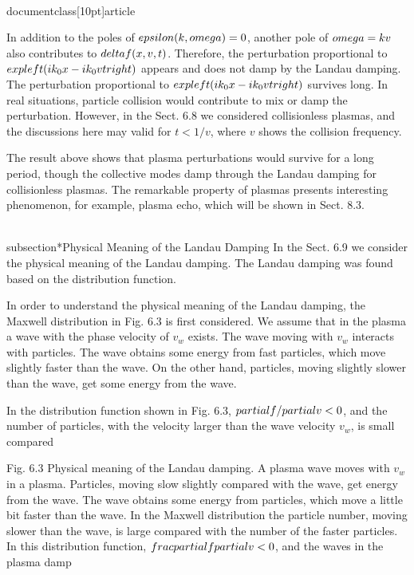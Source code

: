 \\documentclass[10pt]{article}
\begin{document}
{{{{In addition to the poles of $\\epsilon(k, \\omega)=0$, another pole of $\\omega=k v$ also contributes to $\\delta f(x, v, t)$. Therefore, the perturbation proportional to $\\exp \\left(i k_{0} x-i k_{0} v t\\right)$ appears and does not damp by the Landau damping. The perturbation proportional to
$\\exp \\left(i k_{0} x-i k_{0} v t\\right)$ survives long. In real situations, particle collision would contribute to mix or damp the perturbation. However, in the Sect. 6.8 we considered collisionless plasmas, and the discussions here may valid for $t<1 / v$, where $v$ shows the collision frequency.

The result above shows that plasma perturbations would survive for a long period, though the collective modes damp through the Landau damping for collisionless plasmas. The remarkable property of plasmas presents interesting phenomenon, for example, plasma echo, which will be shown in Sect. 8.3.

\\subsection*{Physical Meaning of the Landau Damping}
In the Sect. 6.9 we consider the physical meaning of the Landau damping. The Landau damping was found based on the distribution function.

In order to understand the physical meaning of the Landau damping, the Maxwell distribution in Fig. 6.3 is first considered. We assume that in the plasma a wave with the phase velocity of $v_{w}$ exists. The wave moving with $v_{w}$ interacts with particles. The wave obtains some energy from fast particles, which move slightly faster than the wave. On the other hand, particles, moving slightly slower than the wave, get some energy from the wave.

In the distribution function shown in Fig. 6.3, $\\partial f / \\partial v<0$, and the number of particles, with the velocity larger than the wave velocity $v_{w}$, is small compared

Fig. 6.3 Physical meaning of the Landau damping. A plasma wave moves with $v_{w}$ in a plasma. Particles, moving slow slightly compared with the wave, get energy from the wave. The wave obtains some energy from particles, which move a little bit faster than the wave. In the Maxwell distribution the particle number, moving slower than the wave, is large compared with the number of the faster particles. In this distribution function, $\\frac{\\partial f}{\\partial v}<0$, and the waves in the plasma damp

}}}}
\end{document}
